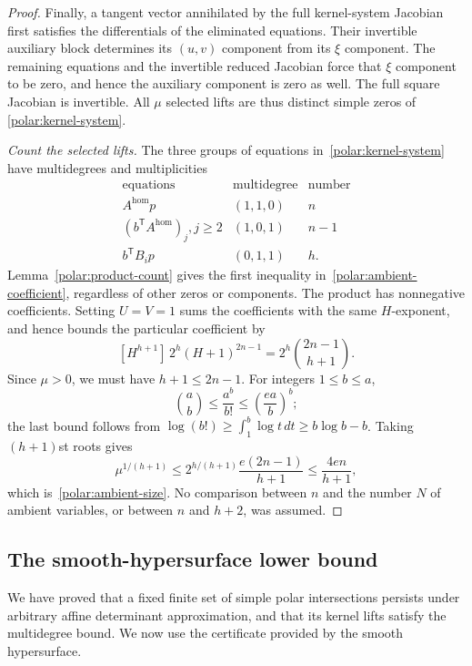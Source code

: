 \begin{proof}
Finally, a tangent vector annihilated by the full kernel-system Jacobian
first satisfies the differentials of the eliminated equations. Their
invertible auxiliary block determines its $(u,v)$ component from its
$\xi$ component. The remaining equations and the invertible reduced
Jacobian force that $\xi$ component to be zero, and hence the auxiliary
component is zero as well. The full square Jacobian is invertible.
All $\mu$ selected lifts are thus distinct simple zeros of
\eqref{polar:kernel-system}.

\emph{Count the selected lifts.}
The three groups of equations in~\eqref{polar:kernel-system} have
multidegrees and multiplicities
\[
 \begin{array}{c|c|c}
 \text{equations}&\text{multidegree}&\text{number}\\ \hline
 A^{\mathrm{hom}} p &(1,1,0)&n\\
 (b^{\mathsf T}A^{\mathrm{hom}})_j, j\ge2 &(1,0,1)&n-1\\
 b^{\mathsf T}B_i p &(0,1,1)&h.
 \end{array}
\]
Lemma~\ref{polar:product-count} gives the first inequality
in~\eqref{polar:ambient-coefficient}, regardless of other zeros or
components. The product has nonnegative coefficients. Setting $U=V=1$
sums the coefficients with the same $H$-exponent, and hence bounds the
particular coefficient by
\[
 [H^{h+1}]\,2^h(H+1)^{2n-1}
       =2^h\binom{2n-1}{h+1}.
\]
Since $\mu>0$, we must have $h+1\le2n-1$. For integers $1\le b\le a$,
\[
 \binom ab\le\frac{a^b}{b!}\le\left(\frac{ea}{b}\right)^b;
\]
the last bound follows from
$\log(b!)\ge\int_1^b\log t\,dt\ge b\log b-b$.
Taking $(h+1)$st roots gives
\[
 \mu^{1/(h+1)}
 \le2^{h/(h+1)}\frac{e(2n-1)}{h+1}
 \le\frac{4en}{h+1},
\]
which is~\eqref{polar:ambient-size}. No comparison between $n$ and
the number $N$ of ambient variables, or between $n$ and $h+2$, was assumed.
\end{proof}

\subsection{The smooth-hypersurface lower bound}

We have proved that a fixed finite set of simple polar intersections
persists under arbitrary affine determinant approximation, and that its
kernel lifts satisfy the multidegree bound. We now use the certificate
provided by the smooth hypersurface.

